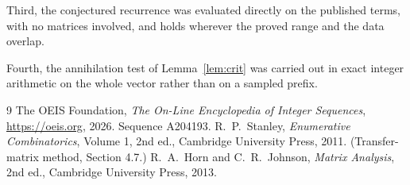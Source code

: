 \documentclass[11pt,a4paper]{article}
\theoremstyle{plain}
\theoremstyle{definition}
\begin{document}
Third, the conjectured recurrence was evaluated directly on the published terms, with no
matrices involved, and holds wherever the proved range and the data overlap.

Fourth, the annihilation test of Lemma~\ref{lem:crit} was carried out in exact integer
arithmetic on the whole vector rather than on a sampled prefix.

\begin{thebibliography}{9}
 The OEIS Foundation, \emph{The On-Line Encyclopedia of Integer
Sequences}, \url{https://oeis.org}, 2026. Sequence A204193.
 R.~P.~Stanley, \emph{Enumerative Combinatorics}, Volume 1, 2nd ed.,
Cambridge University Press, 2011. (Transfer-matrix method, Section 4.7.)
 R.~A.~Horn and C.~R.~Johnson, \emph{Matrix Analysis}, 2nd ed., Cambridge
University Press, 2013.
\end{thebibliography}
\end{document}

